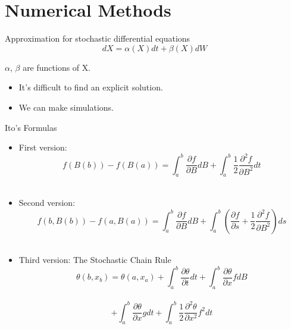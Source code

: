 
\section{Numerical Methods}

\begin{frame}{Approximation for stochastic differential equations}
	\begin{equation*}
	dX=\alpha(X)dt+\beta(X)dW
	\end{equation*}
	\begin{center}
	$\alpha$, $\beta$ are functions of X.	
	\end{center}
	\begin{itemize}
		\item It's difficult to find an explicit solution.
		\item We can make simulations.
	\end{itemize}
\end{frame}

\begin{frame}{Ito's Formulas}
  	\begin{itemize}
   		\item First version: $$f(B(b))-f(B(a))=\int_{a}^{b}{\frac{\partial f}{\partial B} 				dB}+\int_{a}^{b}{\frac{1}{2} \frac{\partial^2 f}{\partial B^2} dt} $$\\
    		\item Second version: $$f(b,B(b))-f(a,B(a))=\int_{a}^{b}{\frac{\partial f}{\partial B} 			dB}+\int_{a}^{b}{(\frac{\partial f}{\partial s}+\frac{1}{2}\frac{\partial ^2 f}{\partial 		B^2}) ds}$$\\
  	\end{itemize}
\end{frame}

\begin{frame}
	\begin{itemize}
	\item Third version: The Stochastic Chain Rule
  		$$\theta(b,x_b)=\theta(a,x_a)+\int_{a}^{b}\frac{\partial\theta}{\partial
  		t}dt+\int_{a}^{b}\frac{\partial\theta}{\partial x}f dB$$\\
  		$$+\int_{a}^{b}\frac{\partial\theta}{\partial x}gdt+\int_{a}^{b}\frac{1}
  		{2}\frac{\partial^2\theta}{\partial x^2}f^2dt$$
  	\end{itemize}
\end{frame}

